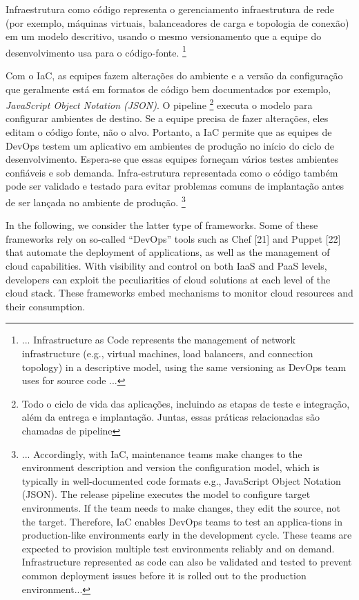 \begin{citacaodireta}
Infraestrutura como código representa o gerenciamento infraestrutura de rede (por exemplo, máquinas virtuais, balanceadores de carga e topologia de conexão) em um modelo descritivo, usando o mesmo versionamento que a equipe do desenvolvimento usa para o código-fonte.\cite[p. 1, tradução nossa]{masek} \footnote { ... Infrastructure as Code represents the management of network infrastructure (e.g., virtual machines, load balancers, and connection topology) in a descriptive model, using the same versioning as DevOps team uses for source code ...}
\end{citacaodireta}

\begin{citacaodireta}
 Com o IaC, as equipes fazem alterações do ambiente e a versão da configuração que geralmente está em formatos de código bem documentados por exemplo, \textit{JavaScript Object Notation (JSON)}. O pipeline \footnote{Todo o ciclo de vida das aplicações, incluindo as etapas de teste e integração, além da entrega e implantação. Juntas, essas práticas relacionadas são chamadas de pipeline} executa o modelo para configurar ambientes de destino. Se a equipe precisa de fazer alterações, eles editam o código fonte, não o alvo. Portanto, a IaC permite que as equipes de DevOps testem um aplicativo em ambientes de produção no início do ciclo de desenvolvimento. Espera-se que essas equipes forneçam vários testes ambientes confiáveis e sob demanda. Infra-estrutura representada como o código também pode ser validado e testado para evitar problemas comuns de implantação antes de ser lançada no ambiente de produção. \cite[p. 2, tradução nossa]{masek} \footnote{... Accordingly, with IaC, maintenance teams make changes to the environment description and version the configuration model, which is typically in well-documented code formats e.g., JavaScript Object Notation (JSON). The release pipeline
executes the model to configure target environments. If the team needs to make changes, they edit the source, not the target. Therefore, IaC enables DevOps teams to test an applica-tions in production-like environments early in the development cycle. These teams are expected to provision multiple test environments reliably and on demand. Infrastructure represented as code can also be validated and tested to prevent common deployment issues before it is rolled out to the production environment...}
 \end {citacaodireta}
 
 \begin{citacaodireta}
 In the following, we consider the latter type of frameworks. Some of these frameworks rely on so-called “DevOps” tools such as Chef [21] and Puppet [22] that automate the deployment of applications, as well as the management of cloud capabilities. With visibility and control on both IaaS and PaaS levels, developers can exploit the peculiarities of cloud solutions at each level of the cloud stack. These frameworks embed
mechanisms to monitor cloud resources and their consumption.  \cite{ferry} 
 \end{citacaodireta}
 

